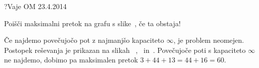 \begin{naloga}{?}{Vaje OM 23.4.2014}
\begin{vprasanje}[pretok5]
Poišči maksimalni pretok na grafu s slike~\fig{}, če ta obstaja!

\begin{slika}
\pgfslika
{}
\end{slika}
\end{vprasanje}

\begin{odgovor}
Če najdemo povečujočo pot z najmanjšo kapaciteto $\infty$,
je problem neomejen.
Postopek reševanja je prikazan na slikah~%
,~ in~.
Povečujoče poti s kapaciteto $\infty$ ne najdemo,
dobimo pa maksimalen pretok $3+44+13 = 44+16 = 60$.

\begin{slika}
\pgfslika[pretok5a]
\end{slika}
\begin{slika}
\pgfslika[pretok5b]
\end{slika}
\begin{slika}
\pgfslika[pretok5c]
\end{slika}
\end{odgovor}
\end{naloga}
